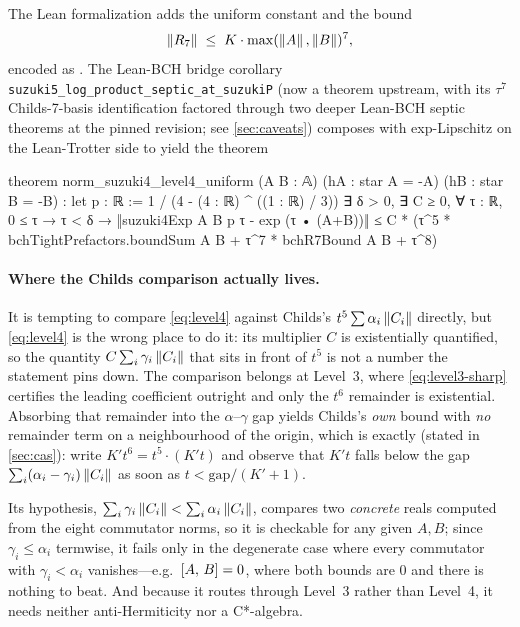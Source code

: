 The Lean formalization adds the uniform constant
and the bound
\begin{equation}
  \left\|R_7\right\| \;\le\; K \cdot \max(\left\|A\right\|, \left\|B\right\|)^7,
\end{equation}
encoded as .
The Lean-BCH bridge corollary
\texttt{suzuki5\_log\_product\_septic\_at\_suzukiP} (now a theorem
upstream, with its $\tau^7$ Childs-7-basis identification factored
through two deeper Lean-BCH septic theorems at the pinned revision;
see \cref{sec:caveats}) composes with exp-Lipschitz on the Lean-Trotter
side to yield the theorem
\begin{leancode}
theorem norm_suzuki4_level4_uniform (A B : 𝔸)
    (hA : star A = -A) (hB : star B = -B) :
    let p : ℝ := 1 / (4 - (4 : ℝ) ^ ((1 : ℝ) / 3))
    ∃ δ > 0, ∃ C ≥ 0, ∀ τ : ℝ, 0 ≤ τ → τ < δ →
      ‖suzuki4Exp A B p τ - exp (τ • (A+B))‖ ≤
        C * (τ^5 * bchTightPrefactors.boundSum A B +
             τ^7 * bchR7Bound A B +
             τ^8)
\end{leancode}

\paragraph{Where the Childs comparison actually lives.}
It is tempting to compare \cref{eq:level4} against Childs's
$t^5 \sum \alpha_i \left\|C_i\right\|$ directly, but \cref{eq:level4} is the
wrong place to do it: its multiplier $C$ is existentially quantified,
so the quantity $C \sum_i \gamma_i \left\|C_i\right\|$ that sits in front of
$t^5$ is not a number the statement pins down. The comparison belongs
at Level~3, where \cref{eq:level3-sharp} certifies the leading
coefficient outright and only the $t^6$ remainder is existential.
Absorbing that remainder into the $\alpha$--$\gamma$ gap yields Childs's
\emph{own} bound with \emph{no} remainder term on a neighbourhood of the
origin, which is exactly
(stated in \cref{sec:cas}): write $K' t^6 = t^5 \cdot (K' t)$ and observe
that $K' t$ falls below the gap $\sum_i (\alpha_i - \gamma_i) \left\|C_i\right\|$
as soon as $t < \mathrm{gap}/(K'+1)$.

Its hypothesis, $\sum_i \gamma_i \left\|C_i\right\| < \sum_i \alpha_i \left\|C_i\right\|$,
compares two \emph{concrete} reals computed from the eight commutator norms,
so it is checkable for any given $A, B$; since $\gamma_i \le \alpha_i$
termwise, it fails only in the degenerate case where every commutator with
$\gamma_i < \alpha_i$ vanishes---e.g.\ $[A,\,B] = 0$, where both bounds
are $0$ and there is nothing to beat. And because it routes through Level~3
rather than Level~4, it needs neither anti-Hermiticity nor a C*-algebra.

